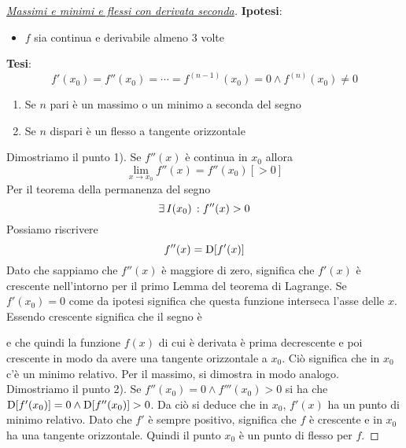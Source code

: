 \begin{proof}
  [\protect\hyperlink{teor:der:Sec:1}{Massimi e minimi e flessi con derivata seconda}]
  \textbf{Ipotesi}:
  \begin{itemize}
    \item $f$ sia continua e derivabile almeno 3 volte
  \end{itemize}
  \textbf{Tesi}:
  \begin{equation*}
    f'(x_0)=f''(x_0)=\dotsb=f^{(n-1)}(x_0)=0\land f^{(n)}(x_0)\neq0
  \end{equation*}
  \begin{enumerate}
    \item Se $n$ pari è un massimo o un minimo a seconda del segno
    \item Se $n$ dispari è un flesso a tangente orizzontale
  \end{enumerate}
  \divisor

  Dimostriamo il punto 1). Se $f''(x)$ è continua in $x_0$ allora
  \begin{equation*}
    \lim\limits_{x\to x_0} f''(x) = f''(x_0)[>0]
  \end{equation*}
  Per il teorema della permanenza del segno
  \begin{equation*}
    \exists\,I(x_0)\,: f''(x)>0
  \end{equation*}
  Possiamo riscrivere
  \begin{equation*}
    f''(x) = \mathop{}\!\mathrm{D}[f'(x)]
  \end{equation*}
  Dato che sappiamo che $f''(x)$ è maggiore di zero, significa che $f'(x)$ è crescente nell'intorno
  per il primo Lemma del teorema di Lagrange. Se $f'(x_0) = 0$ come da ipotesi significa che questa
  funzione interseca l'asse delle $x$. Essendo crescente significa che il segno è
  \begin{center}
  \end{center}
  e che quindi la funzione $f(x)$ di cui è derivata è prima decrescente e poi crescente in modo
  da avere una tangente orizzontale a $x_0$. Ciò significa che in $x_0$ c'è un minimo relativo. Per
  il massimo, si dimostra in modo analogo.\\ [\baselineskip]
  Dimostriamo il punto 2). Se $f''(x_0)=0\land f'''(x_0)>0$ si ha che 
  $\mathop{}\!\mathrm{D}[f'(x_0)]=0\land\mathop{}\!\mathrm{D}[f''(x_0)]>0$. Da ciò si deduce che in $x_0$, $f'(x)$ ha un punto di
  minimo relativo. Dato che $f'$ è sempre positivo, significa che $f$ è crescente e in $x_0$ ha
  una tangente orizzontale. Quindi il punto $x_0$ è un punto di flesso per $f$.
\end{proof}


